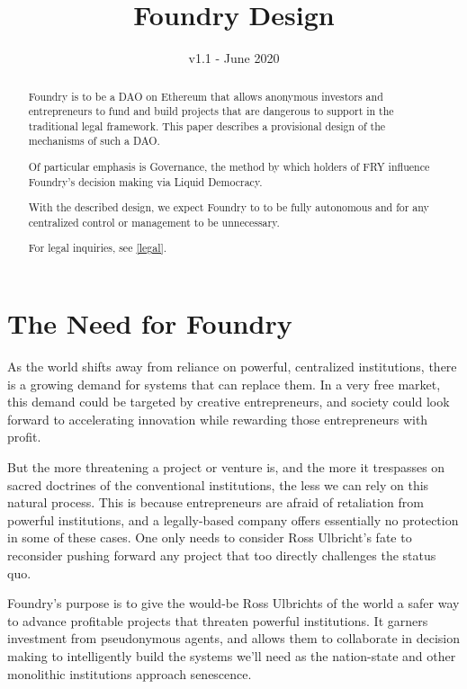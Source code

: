 \documentclass{article}
\title{Foundry Design}
\date{v1.1 - June 2020}
\begin{document}

\maketitle
\begin{abstract}
	\setlength{\parskip}{1em}
	Foundry is to be a DAO on Ethereum that allows anonymous investors and entrepreneurs to fund and build projects that are dangerous to support in the traditional legal framework. This paper describes a provisional design of the mechanisms of such a DAO.
	
	Of particular emphasis is Governance, the method by which holders of FRY influence Foundry's decision making via Liquid Democracy.
	
	With the described design, we expect Foundry to to be fully autonomous and for any centralized control or management to be unnecessary.
	
	For legal inquiries, see \ref{legal}.
\end{abstract}

\newpage
{}
\tableofcontents

\setlength{\parskip}{0.5em}

\newpage
{}
\section{The Need for Foundry} \label{need}

As the world shifts away from reliance on powerful, centralized institutions, there is a growing demand for systems that can replace them. In a very free market, this demand could be targeted by creative entrepreneurs, and society could look forward to accelerating innovation while rewarding those entrepreneurs with profit.

But the more threatening a project or venture is, and the more it trespasses on sacred doctrines of the conventional institutions, the less we can rely on this natural process. This is because entrepreneurs are afraid of retaliation from powerful institutions, and a legally-based company offers essentially no protection in some of these cases. One only needs to consider Ross Ulbricht's fate to reconsider pushing forward any project that too directly challenges the status quo.

Foundry's purpose is to give the would-be Ross Ulbrichts of the world a safer way to advance profitable projects that threaten powerful institutions. It garners investment from pseudonymous agents, and allows them to collaborate in decision making to intelligently build the systems we'll need as the nation-state and other monolithic institutions approach senescence.
\end{document}
